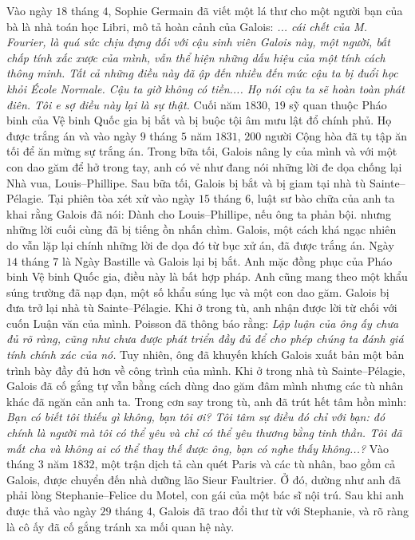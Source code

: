 \begin{multicols}{2}
	\vskip 0.1cm
	Vào ngày $18$ tháng $4$, Sophie Germain đã viết một lá thư cho một người  bạn của bà là nhà toán học Libri, mô tả hoàn cảnh của Galois:
	\vskip 0.1cm
	\textit{... cái chết của M. Fourier, là quá sức chịu đựng đối với cậu sinh viên Galois này, một người, bất chấp tính xấc xược của mình,  vẫn thể hiện những dấu hiệu của một tính cách thông minh. Tất cả những điều này đã ập đến nhiều đến mức cậu ta bị đuổi học khỏi École Normale. Cậu ta giờ không có tiền.... Họ nói cậu ta sẽ hoàn toàn phát điên. Tôi e sợ điều này lại là sự thật.}
	\vskip 0.1cm
	Cuối năm $1830$, $19$ sỹ quan thuộc Pháo binh của Vệ binh Quốc gia bị bắt và bị buộc tội âm mưu lật đổ chính phủ. Họ được trắng án và vào ngày $9$ tháng $5$ năm $1831$, $200$ người Cộng hòa đã tụ tập ăn tối để ăn mừng sự trắng án. Trong bữa tối, Galois nâng ly của mình và với một con dao găm để hở trong tay, anh có vẻ như đang nói những lời đe dọa chống lại Nhà vua, Louis--Phillipe. Sau bữa tối, Galois bị bắt và bị giam tại nhà tù Sainte--Pélagie. Tại phiên tòa xét xử vào ngày $15$ tháng $6$, luật sư bào chữa của anh ta khai rằng Galois đã nói:
	\vskip 0.1cm
	Dành cho Louis--Phillipe, nếu ông ta phản bội.
	\vskip 0.1cm
	nhưng những lời cuối cùng đã bị tiếng ồn nhấn chìm. 
	\vskip 0.1cm
	Galois, một cách khá ngạc nhiên do vẫn lặp lại chính những lời đe dọa đó từ bục xử án, đã được trắng án.
	\vskip 0.1cm
	Ngày $14$ tháng $7$ là Ngày Bastille và Galois lại bị bắt. Anh mặc đồng phục của Pháo binh Vệ binh Quốc gia, điều này là bất hợp pháp. Anh cũng mang theo một khẩu súng trường đã nạp đạn, một số khẩu súng lục và một con dao găm. Galois bị đưa trở lại nhà tù Sainte--Pélagie. Khi ở trong tù, anh nhận được lời từ chối với cuốn Luận văn của mình. Poisson đã thông báo rằng: 
	\vskip 0.1cm
	\textit{Lập luận của ông ấy chưa đủ rõ ràng, cũng như chưa được phát triển đầy đủ để cho phép chúng ta đánh giá tính chính xác của nó.}
	\vskip 0.1cm
	Tuy nhiên, ông đã khuyến khích Galois xuất bản một bản  trình bày đầy đủ hơn về công trình của mình. Khi ở trong nhà tù Sainte--Pélagie, Galois đã cố gắng tự vẫn bằng cách dùng dao găm đâm mình nhưng các tù nhân khác đã ngăn cản anh ta. Trong cơn say trong tù, anh đã trút hết tâm hồn mình:
	\vskip 0.1cm
	\textit{Bạn có biết tôi thiếu gì không, bạn tôi ơi? Tôi tâm sự điều đó chỉ với bạn: đó chính là người mà tôi có thể yêu và chỉ có thể yêu thương bằng tinh thần. Tôi đã mất cha và không ai có thể thay thế được ông, bạn có nghe thấy không...?}
	\vskip 0.1cm
	Vào tháng $3$ năm $1832$, một trận dịch tả càn quét Paris và các tù nhân, bao gồm cả Galois, được chuyển đến nhà dưỡng lão Sieur Faultrier. Ở đó, dường như anh  đã phải lòng Stephanie--Felice du Motel, con gái của một bác sĩ nội trú. Sau khi anh được thả vào ngày $29$ tháng $4$, Galois đã trao đổi thư từ với Stephanie, và rõ ràng là cô ấy đã cố gắng tránh xa mối quan hệ này.

\end{multicols}
